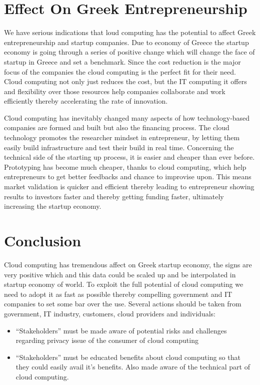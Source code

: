 \documentclass[notitlepage]{report}
\begin{document}
\section*{Effect On Greek Entrepreneurship}

We have serious indications that loud computing has the potential to affect Greek entrepreneurship and startup companies. Due to economy of Greece the startup economy is going through a series of positive change which will change the face of startup in Greece and set a benchmark. Since the cost reduction is the major focus of the companies the cloud computing is the perfect fit for their need. Cloud computing not only just reduces the cost, but the IT computing it offers and flexibility over those resources help companies collaborate and work efficiently thereby accelerating the rate of innovation.

Cloud computing has inevitably changed many aspects of how technology-based companies are formed and built but also the financing process. The cloud technology promotes the researcher mindset in entrepreneur, by letting them easily build infrastructure and test their build in real time. Concerning the technical side of the starting up process, it is easier and cheaper than ever before. Prototyping has become much cheaper, thanks to cloud computing, which help entrepreneurs to get better feedbacks and chance to improvise upon. This means market validation is quicker and efficient thereby leading to entrepreneur showing results to investors faster and thereby getting funding faster, ultimately increasing the startup economy.




\section*{Conclusion}

Cloud computing has tremendous affect on Greek startup economy, the signs are very positive which and this data could be scaled up and be interpolated in startup economy of world. To exploit the full potential of cloud computing we need to adopt it as fast as possible thereby compelling government and IT companies to set some bar over the use. Several actions should be taken from government, IT industry, customers, cloud providers and individuals:
\begin{itemize}

\item “Stakeholders” must be made aware of potential risks and challenges regarding privacy issue of the consumer of cloud computing 
\item“Stakeholders” must be educated benefits about cloud computing so that they could easily avail it’s benefits. Also made aware of the technical part of cloud computing.

\end{itemize}
\end{document}
